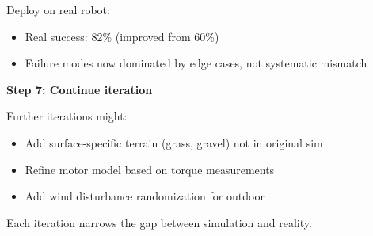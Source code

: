 \begin{example}
Deploy on real robot:
\begin{itemize}
    \item Real success: 82\% (improved from 60\%)
    \item Failure modes now dominated by edge cases, not systematic mismatch
\end{itemize}

\textbf{Step 7: Continue iteration}

Further iterations might:
\begin{itemize}
    \item Add surface-specific terrain (grass, gravel) not in original sim
    \item Refine motor model based on torque measurements
    \item Add wind disturbance randomization for outdoor
\end{itemize}

Each iteration narrows the gap between simulation and reality.
\end{example}

